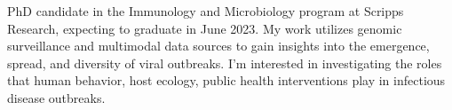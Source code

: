 
\begin{cvparagraph}

    PhD candidate in the Immunology and Microbiology program at Scripps Research, expecting to graduate in June 2023.
    My work utilizes genomic surveillance and multimodal data sources to gain insights into the emergence, spread, and diversity of viral outbreaks.
    I'm interested in investigating the roles that human behavior, host ecology, public health interventions play in infectious disease outbreaks.
\end{cvparagraph}
